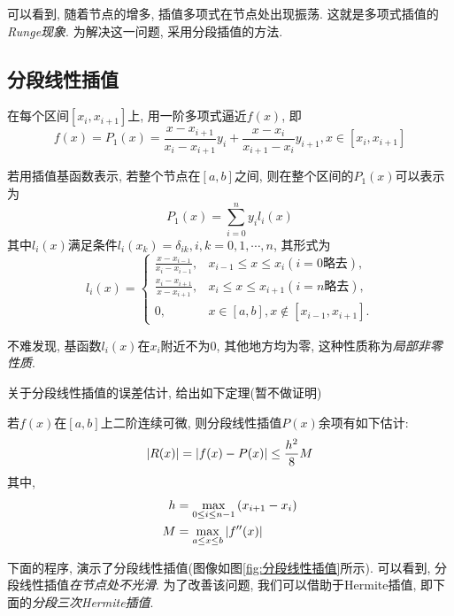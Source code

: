 可以看到, 随着节点的增多, 插值多项式在节点处出现振荡. 这就是多项式插值的\emph{Runge现象}. 为解决这一问题, 采用分段插值的方法.

\subsection{分段线性插值}

在每个区间$[x_i,x_{i+1}]$上, 用一阶多项式逼近$f(x)$, 即
\begin{equation*}
    f(x)=P_1(x)=\frac{x-x_{i+1}}{x_i-x_{i+1}}y_i+\frac{x-x_i}{x_{i+1}-x_i}y_{i+1}, x\in[x_i,x_{i+1}]
\end{equation*}

若用插值基函数表示, 若整个节点在$[a,b]$之间, 则在整个区间的$P_1(x)$可以表示为
\begin{equation*}
    P_1(x)=\sum_{i=0}^ny_il_i(x)
\end{equation*}
其中$l_i(x)$满足条件$l_i(x_k)=\delta_{ik}, i,k=0,1,\cdots,n$, 其形式为
\begin{equation*}
    l_i(x)=
    \begin{cases}
        \frac{x-x_{i-1}}{x_i-x_{i-1}}, &x_{i-1}\le x\le x_i(i=0\text{略去}),\\
        \frac{x_i-x_{i+1}}{x-x_{i+1}}, &x_i\le x\le x_{i+1}(i=n\text{略去}),\\
        0, &x\in[a,b], x\notin[x_{i-1},x_{i+1}].
    \end{cases}
\end{equation*}

不难发现, 基函数$l_i(x)$在$x_i$附近不为0, 其他地方均为零, 这种性质称为\emph{局部非零性质}.

关于分段线性插值的误差估计, 给出如下定理(暂不做证明)%

\begin{theorem}
    若$f(x)$在$[a,b]$上二阶连续可微, 则分段线性插值$P(x)$余项有如下估计:
    \begin{equation*}
        \abs{R(x)}=\abs{f(x)-P(x)}\le\frac{h^2}{8}M
    \end{equation*}
    其中,
    \begin{align*}
        h&=\max_{0\le i\le n-1}\left(x_{i+1}-x_i\right)\\
        M&=\max_{a\le x\le b}\abs{f''(x)}
    \end{align*}
\end{theorem}

下面的程序, 演示了分段线性插值(图像如图\ref{fig:分段线性插值}所示). 可以看到, 分段线性插值\emph{在节点处不光滑}. 为了改善该问题, 我们可以借助于Hermite插值, 即下面的\emph{分段三次Hermite插值}.

